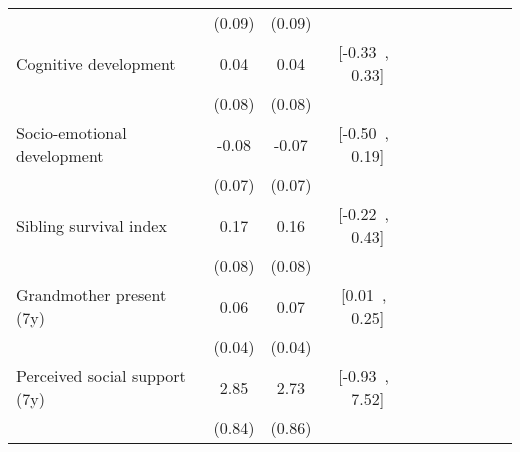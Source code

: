 {\begin{tabular}{l*{3}{SSc}}
          &   (0.09)&   (0.09)&         \\
Cognitive development&     0.04&     0.04&[-0.33$\,$ , $\,$0.33]\\
          &   (0.08)&   (0.08)&         \\
Socio-emotional development&    -0.08&    -0.07&[-0.50$\,$ , $\,$0.19]\\
          &   (0.07)&   (0.07)&         \\
Sibling survival index&     0.17&     0.16&[-0.22$\,$ , $\,$0.43]\\
          &   (0.08)&   (0.08)&         \\
Grandmother present (7y)&     0.06&     0.07&[0.01$\,$ , $\,$0.25]\\
          &   (0.04)&   (0.04)&         \\
Perceived social support (7y)&     2.85&     2.73&[-0.93$\,$ , $\,$7.52]\\
          &   (0.84)&   (0.86)&         \\
\bottomrule
\end{tabular}
}
